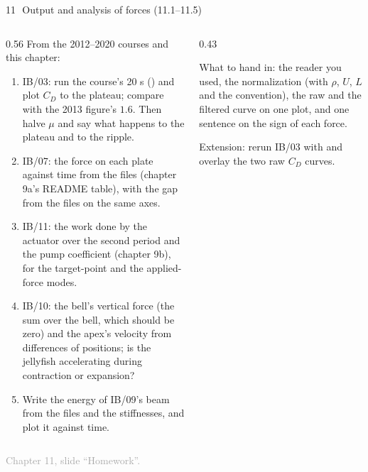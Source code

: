 \documentclass[aspectratio=169,11pt]{beamer}
\newcommand{\sourcecredit}[1]{\vfill\begin{flushright}\tiny\textcolor{DarkGray}{#1}\end{flushright}}
\begin{document}
\begin{frame}{11\,\textbullet\ Output and analysis of forces (11.1--11.5)}
\label{fr:c11x1}
\begin{columns}[T,onlytextwidth]
\begin{column}{0.56\textwidth}
\scriptsize From the 2012--2020 courses and this chapter:
\begin{enumerate}
  \item[11.1] IB/03: run the course's 20 s () and plot $C_D$ to the plateau; compare with the 2013 figure's $1.6$. Then halve $\mu$ and say what happens to the plateau and to the ripple.
  \item[11.2] IB/07: the force on each plate against time from the  files (chapter 9a's README table), with the gap from the  files on the same axes.
  \item[11.3] IB/11: the work done by the actuator over the second period and the pump coefficient (chapter 9b), for the target-point and the applied-force modes.
  \item[11.4] IB/10: the bell's vertical force (the sum over the bell, which should be zero) and the apex's velocity from differences of positions; is the jellyfish accelerating during contraction or expansion?
  \item[11.5] Write the energy of IB/09's beam from the  files and the stiffnesses, and plot it against time.
\end{enumerate}
\end{column}
\begin{column}{0.43\textwidth}
\begin{punchbox}
\scriptsize What to hand in: the reader you used, the normalization (with $\rho$, $U$, $L$ and the convention), the raw and the filtered curve on one plot, and one sentence on the sign of each force.
\end{punchbox}
\scriptsize {} Extension: rerun IB/03 with  and overlay the two raw $C_D$ curves.
\end{column}
\end{columns}
\sourcecredit{Chapter 11, slide ``Homework''.}
\end{frame}
\end{document}
